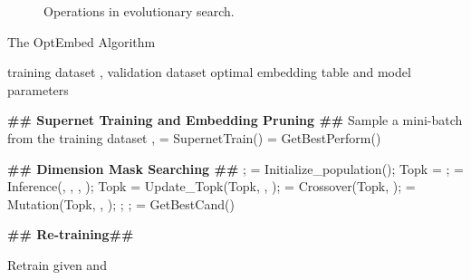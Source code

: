 \documentclass[sigconf]{acmart}
\begin{document}
\begin{figure}[!htbp]
    \centering
    \vspace{-10pt}
    \caption{Operations in evolutionary search.}
    \label{fig:ES}
    \vspace{-10pt}
\end{figure}



\begin{algorithm}
	\caption{The OptEmbed Algorithm} 
    \label{alg:optembed}
	\begin{algorithmic}[1]
		\Require training dataset , validation dataset 
        \Ensure optimal embedding table  and model parameters 
        
        \State \textbf{\#\# Supernet Training and Embedding Pruning \#\#}
            \State Sample a mini-batch from the training dataset
\State,  = SupernetTrain() 
        \EndWhile 
        \State  = GetBestPerform()
        
        \State \textbf{\#\# Dimension Mask Searching \#\#}
        \State ;  = Initialize\_population(); Topk = ;
        \While {}
            \State  = Inference(, , , );
            \State Topk = Update\_Topk(Topk, , );
            \State  = Crossover(Topk, );
            \State  = Mutation(Topk, , );
            \State ;
            \State ;
        \EndWhile
        \State  = GetBestCand() 


        \State \textbf{\#\# Re-training\#\#}

\State Retrain  given  and  


\end{algorithmic}
\end{algorithm}
\vspace{-10pt}
\end{document}
